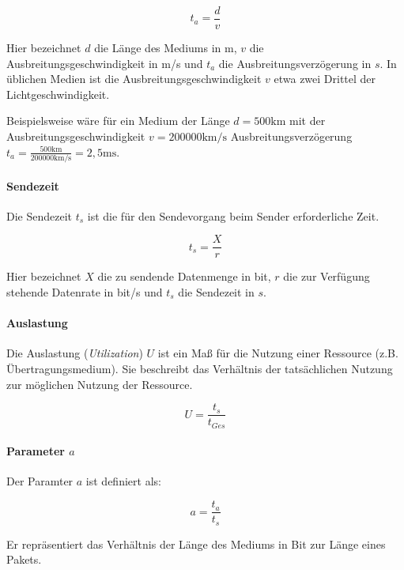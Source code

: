 \documentclass[a4paper, 14pt]{article}
\begin{document}
	\begin{equation*}
		t_a = \frac{d}{v}
	\end{equation*}

	Hier bezeichnet $d$ die Länge des Mediums in m, $v$ die Ausbreitungsgeschwindigkeit in m/s und $t_a$ die Ausbreitungsverzögerung in $s$.
	In üblichen Medien ist die Ausbreitungsgeschwindigkeit $v$ etwa zwei Drittel der Lichtgeschwindigkeit.

	Beispielsweise wäre für ein Medium der Länge $d = 500 \text{km}$ mit der Ausbreitungsgeschwindigkeit $v = 200000 \text{km/s}$ Ausbreitungsverzögerung $t_a = \frac{500 \text{km}}{200000 \text{km/s}} = 2,5 \text{ms}$.

	\paragraph{Sendezeit}

	Die Sendezeit $t_s$ ist die für den Sendevorgang beim Sender erforderliche Zeit.

	\begin{equation*}
		t_s = \frac{X}{r}
	\end{equation*}

	Hier bezeichnet $X$ die zu sendende Datenmenge in bit, $r$ die zur Verfügung stehende Datenrate in bit/s und $t_s$ die Sendezeit in $s$.

	\paragraph{Auslastung}

	Die Auslastung (\emph{Utilization}) $U$ ist ein Maß für die Nutzung einer Ressource (z.B. Übertragungsmedium).
	Sie beschreibt das Verhältnis der tatsächlichen Nutzung zur möglichen Nutzung der Ressource.

	\begin{equation*}
		U = \frac{t_s}{t_{Ges}}
	\end{equation*}

	\paragraph{Parameter $a$}

	Der Paramter $a$ ist definiert als:

	\begin{equation*}
		a = \frac{t_a}{t_s}
	\end{equation*}

	Er repräsentiert das Verhältnis der Länge des Mediums in Bit zur Länge eines Pakets.
\end{document}
